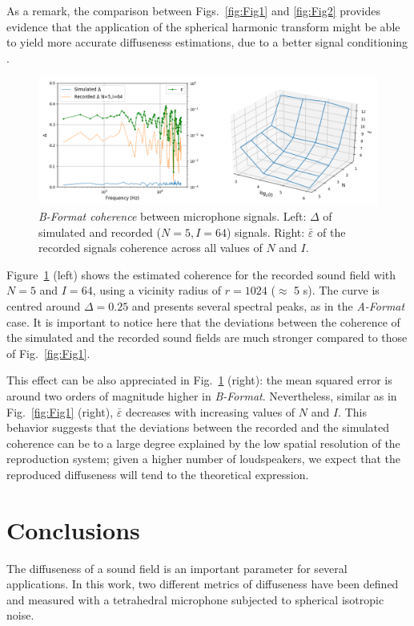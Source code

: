 As a remark, the comparison between Figs.~\ref{fig:Fig1} and \ref{fig:Fig2} provides evidence that the application of the spherical harmonic transform might be able to yield more accurate diffuseness estimations, due to a better signal conditioning \cite{epain2016spherical}.\\


\begin{figure}
	\includegraphics[width=\textwidth]{Figures/CoherenceEstimation/Untitled2}
	\caption{\label{fig:Fig3}\textit{B-Format coherence} between microphone signals. Left: $\Delta$ of simulated and recorded ($N=5, I=64$) signals. Right: $\bar{\varepsilon}$ of the recorded signals coherence across all values of $N$ and $I$.}
\end{figure}


Figure~\ref{fig:Fig3} (left) shows the estimated coherence for the recorded sound field with $N=5$ and $I=64$, using a vicinity radius of $r=1024$ ($\approx$ 5 s).
The curve is centred around $\Delta=0.25$ and presents several spectral peaks, as in the \textit{A-Format} case. 
It is important to notice here that the deviations between the coherence of the simulated and the recorded sound fields are much stronger compared to those of Fig.~\ref{fig:Fig1}. 

\newpage
This effect can be also appreciated in Fig.~\ref{fig:Fig3} (right): the mean squared error is around two orders of magnitude higher in \textit{B-Format}.
Nevertheless, similar as in Fig.~\ref{fig:Fig1} (right), $\bar{\varepsilon}$ decreases with increasing values of $N$ and $I$.
This behavior suggests that the deviations between the recorded and the simulated coherence can be to a large degree explained by the low spatial resolution of the reproduction system; given a higher number of loudspeakers, we expect that the reproduced diffuseness will tend to the theoretical expression.




\section{Conclusions}
The diffuseness of a sound field is an important parameter for several applications. In this work, two different metrics of diffuseness have been defined and measured with a tetrahedral microphone subjected to spherical isotropic noise.

